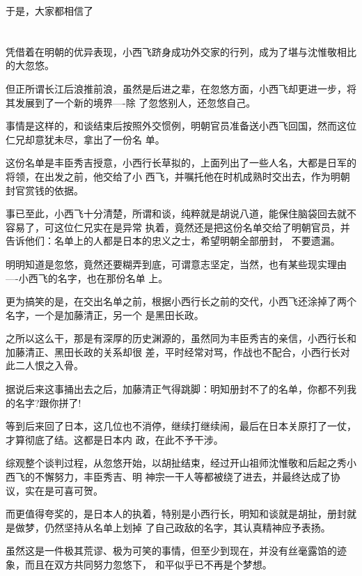 \documentclass[11pt,a4paper,onecolumn]{article}
\begin{document}
于是，大家都相信了

\section[\thesection]{}

凭借着在明朝的优异表现，小西飞跻身成功外交家的行列，成为了堪与沈惟敬相比的大忽悠。

但正所谓长江后浪推前浪，虽然是后进之辈，在忽悠方面，小西飞却更进一步，将其发展到了一个新的境界----除
了忽悠别人，还忽悠自己。

事情是这样的，和谈结束后按照外交惯例，明朝官员准备送小西飞回国，然而这位仁兄却意犹未尽，拿出了一份名
单。

这份名单是丰臣秀吉授意，小西行长草拟的，上面列出了一些人名，大都是日军的将领，在出发之前，他交给了小
西飞，并嘱托他在时机成熟时交出去，作为明朝封官赏钱的依据。

事已至此，小西飞十分清楚，所谓和谈，纯粹就是胡说八道，能保住脑袋回去就不容易了，可这位仁兄实在是异常
执着，竟然还是把这份名单交给了明朝官员，并告诉他们：名单上的人都是日本的忠义之士，希望明朝全部册封，
不要遗漏。

明明知道是忽悠，竟然还要糊弄到底，可谓意志坚定，当然，也有某些现实理由----小西飞的名字，也在那份名单
上。

更为搞笑的是，在交出名单之前，根据小西行长之前的交代，小西飞还涂掉了两个名字，一个是加藤清正，另一个
是黑田长政。

之所以这么干，那是有深厚的历史渊源的，虽然同为丰臣秀吉的亲信，小西行长和加藤清正、黑田长政的关系却很
差，平时经常对骂，作战也不配合，小西行长对此二人恨之入骨。

据说后来这事捅出去之后，加藤清正气得跳脚：明知册封不了的名单，你都不列我的名字?跟你拼了!

等到后来回了日本，这几位也不消停，继续打继续闹，最后在日本关原打了一仗，才算彻底了结。这都是日本内
政，在此不予干涉。

综观整个谈判过程，从忽悠开始，以胡扯结束，经过开山祖师沈惟敬和后起之秀小西飞的不懈努力，丰臣秀吉、明
神宗一干人等都被绕了进去，并最终达成了协议，实在是可喜可贺。

而更值得夸奖的，是日本人的执着，特别是小西行长，明知和谈就是胡扯，册封就是做梦，仍然坚持从名单上划掉
了自己政敌的名字，其认真精神应予表扬。

虽然这是一件极其荒谬、极为可笑的事情，但至少到现在，并没有丝毫露馅的迹象，而且在双方共同努力忽悠下，
和平似乎已不再是个梦想。

\section[\thesection]{}
\end{document}
